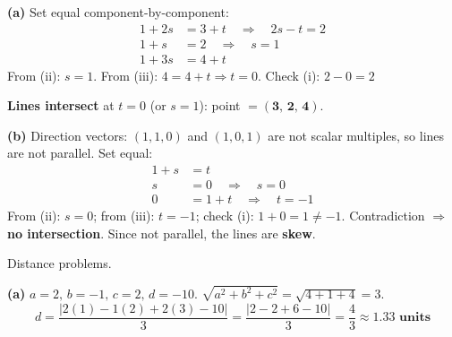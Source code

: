 \documentclass[addpoints]{exam}
\begin{document}
\begin{questions}
\begin{solution}[10cm]
\textbf{(a)} Set equal component-by-component:
\begin{align*}
1+2s &= 3+t \quad\Rightarrow\quad 2s-t=2 \tag{i}\\
1+s &= 2 \quad\Rightarrow\quad s=1 \tag{ii}\\
1+3s &= 4+t \tag{iii}
\end{align*}
From (ii): $s=1$. From (iii): $4=4+t\Rightarrow t=0$. Check (i): $2-0=2$\checkmark

\textbf{Lines intersect} at $t=0$ (or $s=1$): point $= \mathbf{(3,\,2,\,4)}$.

\textbf{(b)} Direction vectors: $(1,1,0)$ and $(1,0,1)$ are not scalar multiples, so lines are
not parallel. Set equal:
\begin{align*}
1+s &= t \tag{i}\\
s &= 0 \quad\Rightarrow\quad s=0 \tag{ii}\\
0 &= 1+t \quad\Rightarrow\quad t=-1 \tag{iii}
\end{align*}
From (ii): $s=0$; from (iii): $t=-1$; check (i): $1+0=1 \neq -1$.
Contradiction $\Rightarrow$ \textbf{no intersection}. Since not parallel, the lines are
\textbf{skew}.
\end{solution}

\question Distance problems.
\begin{solution}[10cm]
\textbf{(a)} $a=2,\,b=-1,\,c=2,\,d=-10$. $\sqrt{a^2+b^2+c^2}=\sqrt{4+1+4}=3$.
\[
d = \frac{|2(1)-1(2)+2(3)-10|}{3} = \frac{|2-2+6-10|}{3} = \frac{4}{3}
\approx \mathbf{1.33 \text{ units}}
\]


\end{solution}
\end{questions}
\end{document}

